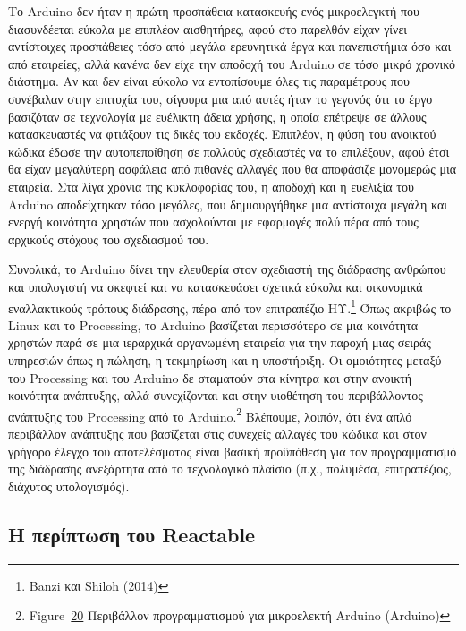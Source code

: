 \documentclass[
]{article}
\begin{document}
Το Arduino δεν ήταν η πρώτη προσπάθεια κατασκευής ενός μικροελεγκτή που
διασυνδέεται εύκολα με επιπλέον αισθητήρες, αφού στο παρελθόν είχαν
γίνει αντίστοιχες προσπάθειες τόσο από μεγάλα ερευνητικά έργα και
πανεπιστήμια όσο και από εταιρείες, αλλά κανένα δεν είχε την αποδοχή του
Arduino σε τόσο μικρό χρονικό διάστημα. Αν και δεν είναι εύκολο να
εντοπίσουμε όλες τις παραμέτρους που συνέβαλαν στην επιτυχία του,
σίγουρα μια από αυτές ήταν το γεγονός ότι το έργο βασιζόταν σε
τεχνολογία με ευέλικτη άδεια χρήσης, η οποία επέτρεψε σε άλλους
κατασκευαστές να φτιάξουν τις δικές του εκδοχές. Επιπλέον, η φύση του
ανοικτού κώδικα έδωσε την αυτοπεποίθηση σε πολλούς σχεδιαστές να το
επιλέξουν, αφού έτσι θα είχαν μεγαλύτερη ασφάλεια από πιθανές αλλαγές
που θα αποφάσιζε μονομερώς μια εταιρεία. Στα λίγα χρόνια της κυκλοφορίας
του, η αποδοχή και η ευελιξία του Arduino αποδείχτηκαν τόσο μεγάλες, που
δημιουργήθηκε μια αντίστοιχα μεγάλη και ενεργή κοινότητα χρηστών που
ασχολούνται με εφαρμογές πολύ πέρα από τους αρχικούς στόχους του
σχεδιασμού του.

Συνολικά, το Arduino δίνει την ελευθερία στον σχεδιαστή της διάδρασης
ανθρώπου και υπολογιστή να σκεφτεί και να κατασκευάσει σχετικά εύκολα
και οικονομικά εναλλακτικούς τρόπους διάδρασης, πέρα από τον επιτραπέζιο
ΗΥ.\footnote{Banzi και Shiloh (2014)} Όπως ακριβώς το Linux και το
Processing, το Arduino βασίζεται περισσότερο σε μια κοινότητα χρηστών
παρά σε μια ιεραρχικά οργανωμένη εταιρεία για την παροχή μιας σειράς
υπηρεσιών όπως η πώληση, η τεκμηρίωση και η υποστήριξη. Οι ομοιότητες
μεταξύ του Processing και του Arduino δε σταματούν στα κίνητρα και στην
ανοικτή κοινότητα ανάπτυξης, αλλά συνεχίζονται και στην υιοθέτηση του
περιβάλλοντος ανάπτυξης του Processing από το Arduino.\footnote{Figure~\protect\hyperlink{fig:arduino-ide}{20}
  Περιβάλλον προγραμματισμού για μικροελεκτή Arduino (Arduino)}
Βλέπουμε, λοιπόν, ότι ένα απλό περιβάλλον ανάπτυξης που βασίζεται στις
συνεχείς αλλαγές του κώδικα και στον γρήγορο έλεγχο του αποτελέσματος
είναι βασική προϋπόθεση για τον προγραμματισμό της διάδρασης ανεξάρτητα
από το τεχνολογικό πλαίσιο (π.χ., πολυμέσα, επιτραπέζιος, διάχυτος
υπολογισμός).

\hypertarget{ux3b7-ux3c0ux3b5ux3c1ux3afux3c0ux3c4ux3c9ux3c3ux3b7-ux3c4ux3bfux3c5-reactable}{%
\subsection{Η περίπτωση του
Reactable}\label{ux3b7-ux3c0ux3b5ux3c1ux3afux3c0ux3c4ux3c9ux3c3ux3b7-ux3c4ux3bfux3c5-reactable}}
\end{document}
